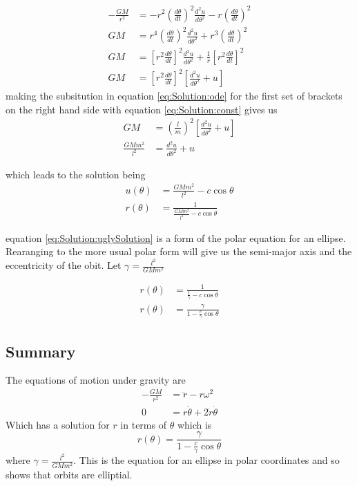 \begin{align}
-\frac{GM}{r^2}&=-r^2\left(\frac{d\theta}{dt}\right)^2\frac{d^2u}{d\theta^2} - r\left(\frac{d\theta}{dt}\right)^2 \nonumber \\
GM&=r^4\left(\frac{d\theta}{dt}\right)^2\frac{d^2u}{d\theta^2} + r^3\left(\frac{d\theta}{dt}\right)^2 \nonumber \\
GM&=\left[r^2\frac{d\theta}{dt}\right]^2\frac{d^2u}{d\theta^2} + \frac{1}{r}\left[r^2\frac{d\theta}{dt}\right]^2 \nonumber \\
GM&=\left[r^2\frac{d\theta}{dt}\right]^2\left[\frac{d^2u}{d\theta^2} + u\right] \label{eq:Solution:ode}
\end{align}
making the subsitution in equation \ref{eq:Solution:ode} for the first set of brackets on the right hand side with equation \ref{eq:Solution:const} gives us
\begin{align}
GM&=\left(\frac{l}{m}\right)^2\left[\frac{d^2u}{d\theta^2} + u\right] \nonumber \\
\frac{GMm^2}{l^2}&=\frac{d^2u}{d\theta^2} + u
\end{align}

which leads to the solution being
\begin{align}
u(\theta)&=\frac{GMm^2}{l^2}-c\cos \theta \nonumber \\
r(\theta)&=\frac{1}{\frac{GMm^2}{l^2}-c\cos \theta} \label{eq:Solution:uglySolution}
\end{align}

equation \ref{eq:Solution:uglySolution} is a form of the polar equation for an ellipse. Rearanging to the more usual polar form will give us the semi-major axis and the eccentricity of the obit. Let $\gamma=\frac{l^2}{GMm^2}$

\begin{align}
r(\theta)&=\frac{1}{\frac{1}{\gamma}-c\cos \theta} \nonumber \\
r(\theta)&=\frac{\gamma}{1-\frac{c}{\gamma}\cos \theta} \label{eq:Solution:neatSolution}
\end{align}

\begin{framed}
\subsection{Summary}
The equations of motion under gravity are
\begin{align*}
-\frac{GM}{r^2} &=\ddot{r} - r \omega^2 \\
0 &=r \ddot{\theta} + 2 \dot{r} \dot{\theta}
\end{align*}
Which has a solution for $r$ in terms of $\theta$ which is
\begin{equation*}
r(\theta)=\frac{\gamma}{1-\frac{c}{\gamma}\cos \theta}
\end{equation*}
where $\gamma=\frac{l^2}{GMm^2}$. This is the equation for an ellipse in polar coordinates and so shows that orbits are elliptial.
\end{framed}